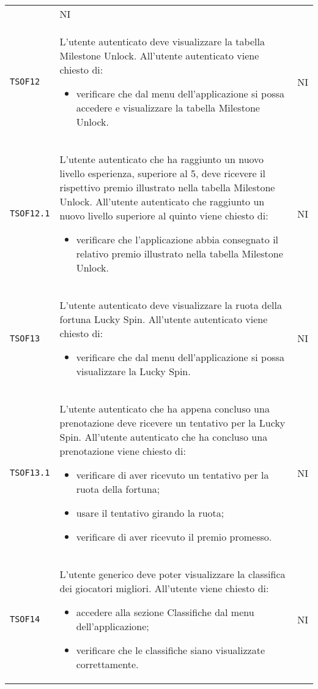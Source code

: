 \begin{longtable}{ >{\centering}p{} >{\centering}p{}
			>{\centering}p{}}
\begin{itemize}
		 \end{itemize}	&	NI	\tabularnewline
		 \texttt{TSOF12}	&	L'utente autenticato deve visualizzare la tabella Milestone Unlock\glo. All'utente autenticato viene chiesto di:
		 \begin{itemize}
		 	\item verificare che dal menu dell'applicazione si possa accedere e visualizzare la tabella Milestone Unlock.
		 \end{itemize}	&	NI	\tabularnewline		 
		 \texttt{TSOF12.1}	&	L'utente autenticato che ha raggiunto un nuovo livello esperienza, superiore al 5, deve ricevere il rispettivo premio illustrato nella tabella Milestone Unlock\glo. All'utente autenticato che raggiunto un nuovo livello superiore al quinto viene chiesto di:
		 \begin{itemize}
		 	\item verificare che l'applicazione abbia consegnato il relativo premio illustrato nella tabella Milestone Unlock.
		 \end{itemize}	&	NI	\tabularnewline
		 \texttt{TSOF13}	&	L'utente autenticato deve visualizzare la ruota della fortuna Lucky Spin\glo. All'utente autenticato viene chiesto di:
		 \begin{itemize}
		 	\item verificare che dal menu dell'applicazione si possa visualizzare la Lucky Spin.
		 \end{itemize}	&	NI	\tabularnewline		 
		 \texttt{TSOF13.1}	&	L'utente autenticato che ha appena concluso una prenotazione deve ricevere un tentativo per la Lucky Spin\glo. All'utente autenticato che ha concluso una prenotazione viene chiesto di:
		 \begin{itemize}
		 	\item verificare di aver ricevuto un tentativo per la ruota della fortuna;
		 	\item usare il tentativo girando la ruota;
		 	\item verificare di aver ricevuto il premio promesso.
		 \end{itemize}	&	NI	\tabularnewline	
		  \texttt{TSOF14}	&	L'utente generico deve poter visualizzare la classifica dei giocatori migliori. All'utente viene chiesto di:
		 \begin{itemize}
		 	\item accedere alla sezione Classifiche dal menu dell'applicazione;
		 	\item verificare che le classifiche siano visualizzate correttamente.
		 \end{itemize}	&	NI	\tabularnewline	

\end{longtable}

